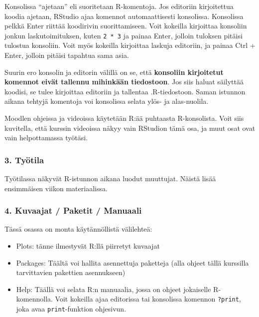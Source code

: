 \documentclass[
]{book}
\providecommand{\tightlist}{%
  \setlength{\itemsep}{0pt}\setlength{\parskip}{0pt}}
\begin{document}
Konsolissa ``ajetaan'' eli suoritetaan R-komentoja. Jos editoriin kirjoitettua koodia ajetaan, RStudio ajaa komennot automaattisesti konsolissa. Konsolissa pelkkä Enter riittää koodirivin suorittamiseen. Voit kokeilla kirjoittaa konsoliin jonkun laskutoimituksen, kuten \texttt{2\ *\ 3} ja painaa Enter, jolloin tuloksen pitäisi tulostua konsoliin. Voit myös kokeilla kirjoittaa laskuja editoriin, ja painaa Ctrl + Enter, jolloin pitäisi tapahtua sama asia.

Suurin ero konsolin ja editorin välillä on se, että \textbf{konsoliin kirjoitetut komennot eivät tallennu mihinkään tiedostoon}. Jos siis haluat säilyttää koodisi, se tulee kirjoittaa editoriin ja tallentaa .R-tiedostoon. Saman istunnon aikana tehtyjä komentoja voi konsolissa selata ylös- ja alas-nuolila.

Moodlen ohjeissa ja videoissa käytetään R:ää puhtaasta R-konsolista. Voit siis kuvitella, että kurssin videoissa näkyy vain RStudion tämä osa, ja muut osat ovat vain helpottamassa työtäsi.

\hypertarget{tyuxf6tila}{%
\subsubsection*{3. Työtila}\label{tyuxf6tila}}

Työtilassa näkyvät R-istunnon aikana luodut muuttujat. Näistä lisää ensimmäisen viikon materiaalissa.

\hypertarget{kuvaajat-paketit-manuaali}{%
\subsubsection*{4. Kuvaajat / Paketit / Manuaali}\label{kuvaajat-paketit-manuaali}}

Tässä osassa on monta käytännöllistä välilehteä:

\begin{itemize}
\tightlist
\item
  Plots: tänne ilmestyvät R:llä piirretyt kuvaajat
\item
  Packages: Täältä voi hallita asennettuja paketteja (alla ohjeet tällä kurssilla tarvittavien pakettien asennukseen)
\item
  Help: Täällä voi selata R:n manuaalia, jossa on ohjeet jokaiselle R-komennolla. Voit kokeilla ajaa editorissa tai konsolissa komennon \texttt{?print}, joka avaa \texttt{print}-funktion ohjesivun.
\end{itemize}
\end{document}
